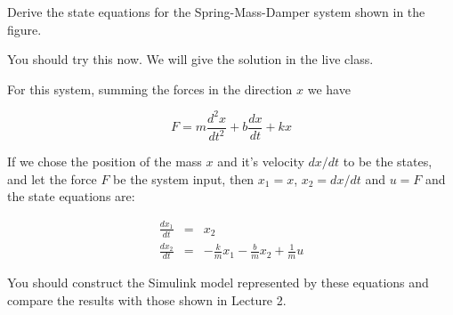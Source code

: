 \begin{slide}
	Derive the state equations for the Spring-Mass-Damper system shown in the figure.
	\begin{center}
	\end{center}

	You should try this now. We will give the solution in the live class.
\end{slide}

For this system, summing the forces in the direction $x$ we have

$$F = m\frac{d^2x}{dt^2} + b\frac{dx}{dt} + kx$$

If we chose the position of the mass $x$ and it's velocity $dx/dt$ to be the states, and let the force $F$ be the system input, then $x_1 = x$, $x_2 = dx/dt$ and $u=F$ and the state equations are:

\begin{eqnarray*}
	\frac{dx_1}{dt} & = & x_2 \\
	\frac{dx_2}{dt} & = & -\frac{k}{m} x_1 -\frac{b}{m} x_2 + \frac{1}{m} u
\end{eqnarray*}

You should construct the Simulink model represented by these equations and compare the results with those shown in Lecture 2.

